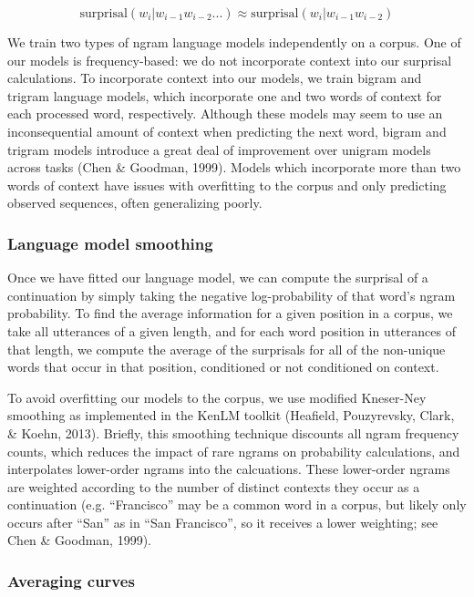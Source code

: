 \documentclass[10pt, letterpaper]{article}
\begin{document}
\[\text{surprisal}(w_i|w_{i-1}w_{i-2}...) \approx \text{surprisal}(w_i|w_{i-1}w_{i-2})\]

We train two types of ngram language models independently on a corpus.
One of our models is frequency-based: we do not incorporate context into
our surprisal calculations. To incorporate context into our models, we
train bigram and trigram language models, which incorporate one and two
words of context for each processed word, respectively. Although these
models may seem to use an inconsequential amount of context when
predicting the next word, bigram and trigram models introduce a great
deal of improvement over unigram models across tasks (Chen \& Goodman,
1999). Models which incorporate more than two words of context have
issues with overfitting to the corpus and only predicting observed
sequences, often generalizing poorly.

\hypertarget{language-model-smoothing}{%
\subsubsection{Language model
smoothing}\label{language-model-smoothing}}

Once we have fitted our language model, we can compute the surprisal of
a continuation by simply taking the negative log-probability of that
word's ngram probability. To find the average information for a given
position in a corpus, we take all utterances of a given length, and for
each word position in utterances of that length, we compute the average
of the surprisals for all of the non-unique words that occur in that
position, conditioned or not conditioned on context.

To avoid overfitting our models to the corpus, we use modified
Kneser-Ney smoothing as implemented in the KenLM toolkit (Heafield,
Pouzyrevsky, Clark, \& Koehn, 2013). Briefly, this smoothing technique
discounts all ngram frequency counts, which reduces the impact of rare
ngrams on probability calculations, and interpolates lower-order ngrams
into the calcuations. These lower-order ngrams are weighted according to
the number of distinct contexts they occur as a continuation (e.g.
``Francisco'' may be a common word in a corpus, but likely only occurs
after ``San'' as in ``San Francisco'', so it receives a lower weighting;
see Chen \& Goodman, 1999).

\hypertarget{averaging-curves}{%
\subsubsection{Averaging curves}\label{averaging-curves}}
\end{document}
